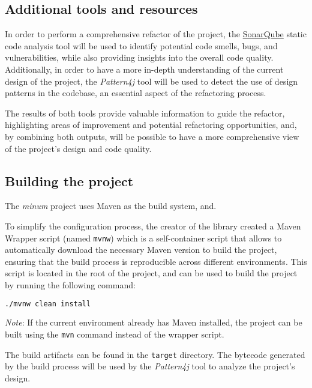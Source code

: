 \subsection{Additional tools and resources}

In order to perform a comprehensive refactor of the project, the \href{https://www.sonarsource.com/}{SonarQube} static code analysis tool will be used to identify potential code smells, bugs, and vulnerabilities, while also providing insights into the overall code quality. Additionally, in order to have a more in-depth understanding of the current design of the project, the \textit{Pattern4j} tool will be used to detect the use of design patterns in the codebase, an essential aspect of the refactoring process.

The results of both tools provide valuable information to guide the refactor, highlighting areas of improvement and potential refactoring opportunities, and, by combining both outputs, will be possible to have a more comprehensive view of the project's design and code quality.

\subsection{Building the project}

The \emph{minum} project uses Maven as the build system, and.

To simplify the configuration process, the creator of the library created a Maven Wrapper script (named \texttt{mvnw}) which is a self-container script that allows to automatically download the necessary Maven version to build the project, ensuring that the build process is reproducible across different environments. This script is located in the root of the project, and can be used to build the project by running the following command:

\begin{center}
	\begin{minipage}{0.5\textwidth}
		\begin{lstlisting}[language=bash, caption={Building the project using Maven Wrapper script}]
    ./mvnw clean install
  \end{lstlisting}
	\end{minipage}
\end{center}

\textit{Note}: If the current environment already has Maven installed, the project can be built using the \texttt{mvn} command instead of the wrapper script.

\noindent The build artifacts can be found in the \texttt{target} directory. The bytecode generated by the build process will be used by the \textit{Pattern4j} tool to analyze the project's design.
